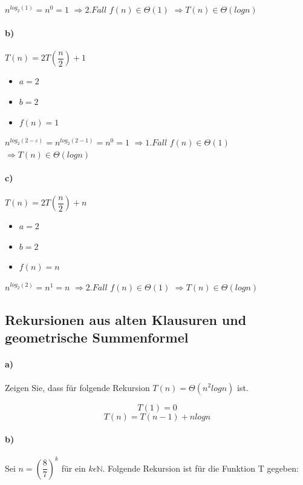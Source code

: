 \documentclass[paper=a4, fontsize=11pt]{scrartcl}
\numberwithin{equation}{section}
\numberwithin{figure}{section}
\numberwithin{table}{section}
\begin{document}
$n^{log_{2}(1)} = n^{0} = 1$
$\Rightarrow 2. Fall$
$f(n) \in \Theta (1)$
$\Rightarrow T(n) \in \Theta(log n)$

\paragraph{b)}
$T(n) = 2T( \dfrac{n}{2}) + 1$

\begin{itemize}
\item $a = 2$
\item $b = 2$
\item $f(n) = 1$
\end{itemize}

$n^{log_{2}(2- \varepsilon)} = n^{log_{2}(2-1)} = n^{0} = 1$
$\Rightarrow 1. Fall$
$f(n) \in \Theta (1)$
$\Rightarrow T(n) \in \Theta(log n)$

\paragraph{c)}
$T(n) = 2T( \dfrac{n}{2}) + n$

\begin{itemize}
\item $a = 2$
\item $b = 2$
\item $f(n) = n$
\end{itemize}

$n^{log_{2}(2)} = n^{1} = n$
$\Rightarrow 2.Fall$
$f(n) \in \Theta (1)$
$\Rightarrow T(n) \in \Theta(log n)$

\subsection{Rekursionen aus alten Klausuren und geometrische Summenformel}
\paragraph{a)}

Zeigen Sie, dass für folgende Rekursion $T(n) = \Theta (n^{2} log n)$ ist. 

$$T(1) = 0$$ 
$$T(n) = T(n-1) + n log n $$

\paragraph{b)}
Sei $n = ( \dfrac{8}{7})^{k}$ für ein $k \epsilon \mathbb{N}$. Folgende Rekursion ist für die Funktion T gegeben:
\end{document}
